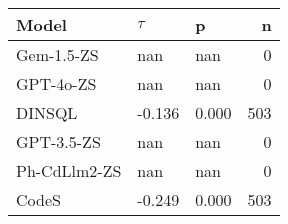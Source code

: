 \begin{tabular}{lllr}
\toprule
Model & $\tau$ & p & n \\
\midrule
Gem-1.5-ZS & nan & nan & 0 \\
GPT-4o-ZS & nan & nan & 0 \\
DINSQL & -0.136 & 0.000 & 503 \\
GPT-3.5-ZS & nan & nan & 0 \\
Ph-CdLlm2-ZS & nan & nan & 0 \\
CodeS & -0.249 & 0.000 & 503 \\
\bottomrule
\end{tabular}
